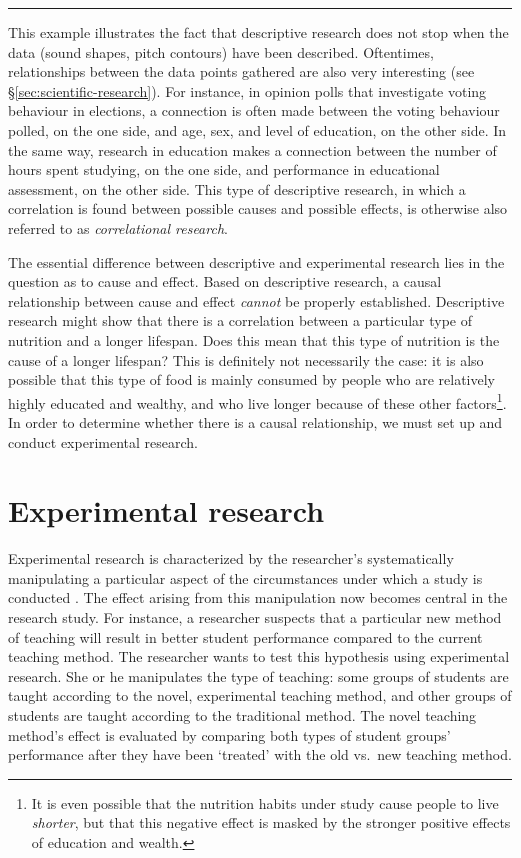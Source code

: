\documentclass[
]{book}
\begin{document}
\begin{center}\rule{0.5\linewidth}{0.5pt}\end{center}

This example illustrates the fact that descriptive research does not stop when the data (sound shapes, pitch contours) have been described. Oftentimes, relationships between the data points gathered are also very interesting (see §\ref{sec:scientific-research}). For instance, in opinion polls that investigate voting behaviour in elections, a connection is often made between the voting behaviour polled, on the one side, and age, sex, and level of education, on the other side. In the same way, research in education makes a connection between the number of hours spent studying, on the one side, and performance in educational assessment, on the other side. This type of descriptive research, in which a correlation is found between possible causes and possible effects, is otherwise also referred to as \emph{correlational research}.

The essential difference between descriptive and experimental research lies in the question as to cause and effect. Based on descriptive research, a causal relationship between cause and effect \emph{cannot} be properly established. Descriptive research might show that there is a correlation between a particular type of nutrition and a longer lifespan. Does this mean that this type of nutrition is the cause of a longer lifespan? This is definitely not necessarily the case: it is also possible that this type of food is mainly consumed by people who are relatively highly educated and wealthy, and who live longer because of these other factors\footnote{It is even possible that the nutrition habits under study cause people to live \emph{shorter}, but that this negative effect is masked by the stronger positive effects of education and wealth.}. In order to determine whether there is a causal relationship, we must set up and conduct experimental research.

\hypertarget{sec:experimental-research}{%
\section{Experimental research}\label{sec:experimental-research}}

Experimental research is characterized by the researcher's systematically manipulating a particular aspect of the circumstances under which a study is conducted \citep{SCC02}. The effect arising from this manipulation now becomes central in the research study. For instance, a researcher suspects that a particular new method of teaching will result in better student performance compared to the current teaching method. The researcher wants to test this hypothesis using experimental research. She or he manipulates the type of teaching: some groups of students are taught according to the novel, experimental teaching method, and other groups of students are taught according to the traditional method. The novel teaching method's effect is evaluated by comparing both types of student groups' performance after they have been `treated' with the old vs.~new teaching method.
\end{document}
